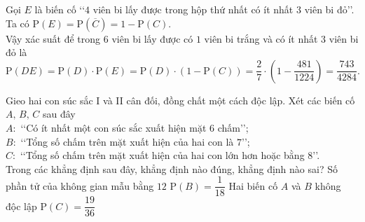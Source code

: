 \begin{ex}
{\begin{itemchoice}
   Gọi $E$ là biến cố \lq\lq $4$ viên  bi lấy được trong hộp thứ nhất có ít nhất $3$ viên bi đỏ\rq\rq.\\
   Ta  có $\mathrm{P}\left(E \right)=\mathrm{P}\left(\overline{C} \right)=1-\mathrm{P}\left(C \right)$.\\
   Vậy xác suất để trong $6$ viên bi lấy được có $1$ viên bi trắng và có ít nhất $3$  viên bi đỏ là
   $$\mathrm{P}\left(DE \right)=\mathrm{P}\left(D \right)\cdot \mathrm{P}\left(E \right)=\mathrm{P}\left(D \right)\cdot \left(1-\mathrm{P}\left(C \right) \right)=\dfrac{2}{7}\cdot \left(1-\dfrac{481}{1224} \right)=\dfrac{743}{4284}.$$ 
  \end{itemchoice}
 } 
\end{ex}

\begin{ex}%
 Gieo hai  con súc sắc I và II cân đối, đồng chất một cách độc lập. Xét các biến cố $A,\,B,\,C$ sau đây\\
 \indent \indent $A\colon$ \lq\lq Có ít nhất một con súc sắc  xuất hiện mặt $6$ chấm\rq\rq;\\
 \indent \indent $B\colon$ \lq\lq Tổng số chấm trên mặt xuất hiện  của hai con là $7$\rq\rq;\\
 \indent \indent $C\colon$ \lq\lq Tổng số chấm trên mặt xuất  hiện của hai con lớn hơn hoặc bằng $8$\rq\rq.\\
 Trong các khẳng định sau đây, khẳng định nào đúng, khẳng  định nào sai?
  \choiceTF
   {Số phần tử của không gian mẫu bằng $12$}
  {$\mathrm{P}(B)=\dfrac{1}{18}$} 
  {\True Hai biến cố $A$ và $B$  không độc lập}
  {$\mathrm{P}(C)=\dfrac{19}{36}$} 
\end{ex}
